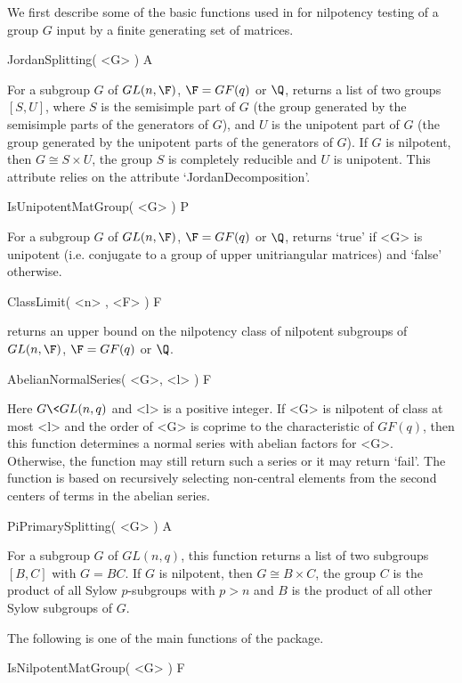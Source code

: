 

We first describe some of the basic functions used in
 for nilpotency testing of a group $G$ input by a
finite generating set of matrices.

\> JordanSplitting( <G> ) A

For a subgroup $G$ of $GL(n,\F)$, $\F=GF(q)$ or $\Q$, returns a list
of two groups $[S,U]$, where $S$ is the semisimple part of $G$ (the
group generated by the semisimple parts of the generators of $G$),
and $U$ is the unipotent part of $G$ (the group generated by the
unipotent parts of the generators of $G$). If $G$ is nilpotent, then
$G \cong S \times U$, the group $S$ is completely reducible and $U$
is unipotent. This attribute relies on the {\GAP} attribute
`JordanDecomposition'.

\> IsUnipotentMatGroup( <G> ) P

For a subgroup $G$ of $GL(n,\F)$, $\F=GF(q)$ or $\Q$, returns `true'
if <G> is unipotent (i.e. conjugate to a group of upper unitriangular
matrices) and `false' otherwise.

\> ClassLimit( <n> , <F> ) F

returns an upper bound on the nilpotency class of nilpotent
subgroups of $GL(n,\F)$, $\F=GF(q)$ or $\Q$.

\> AbelianNormalSeries( <G>, <l> ) F

Here $G\< GL(n,q)$ and <l> is a positive integer. If <G> is nilpotent
of class at most <l> and the order of <G> is coprime to the
characteristic of $GF(q)$, then this function determines a normal
series with abelian factors for <G>. Otherwise, the function may
still return such a series or it may return `fail'. The function is
based on recursively selecting non-central elements from the second
centers of terms in the abelian series.

\> PiPrimarySplitting( <G> ) A

For a subgroup $G$ of $GL(n,q)$, this function returns a list of
two subgroups $[B,C]$ with $G = BC$. If $G$ is nilpotent, then
$G \cong B \times C$, the group $C$ is the product of all Sylow
$p$-subgroups with $p>n$ and $B$ is the product of all other
Sylow subgroups of $G$.


The following is one of the main functions of the 
package.

\> IsNilpotentMatGroup( <G> ) F

